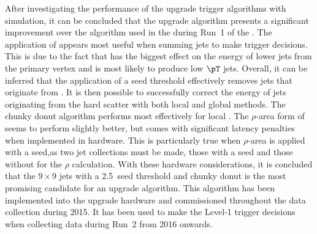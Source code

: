 After investigating the performance of the upgrade trigger algorithms
with simulation, it can be concluded that the upgrade algorithm
presents a significant improvement over the algorithm used in the \GCT
during Run~1 of the \LHC. The application of \PUS appears most useful
when summing jets to make trigger decisions. This is due to the fact
that \PU has the biggest effect on the energy of lower \pT jets from
the primary vertex and is most likely to produce low $\pT$ jets.
Overall, it can be inferred that the application of a seed threshold
effectively removes jets that originate from \PU. It is then possible
to successfully correct the energy of jets originating from the hard scatter with
both local and global \PUS methods. The chunky donut algorithm
performs most effectively for local \PUS. The $\rho$-area form of
\PUS seems to perform slightly better, but comes with significant
latency penalties when implemented in hardware. This is particularly
true when $\rho$-area \PUS is applied with a seed,as two jet
collections must be made, those with a seed and those without for the
$\rho$ calculation. With these hardware considerations, it is
concluded that the $9\times9$ \TT jets with a 2.5~\gev seed threshold and
chunky donut \PUS is the most promising candidate for an upgrade
algorithm. This algorithm has been implemented into the upgrade
hardware and commissioned throughout the data collection during 2015.
It has been used to make the Level-1 trigger decisions when collecting
data during Run~2 from 2016 onwards.

%





